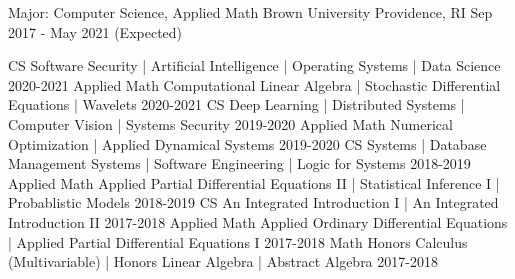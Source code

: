 \begin{cventries}
  \cventry
    {Major: Computer Science, Applied Math}
    {Brown University}
    {Providence, RI}
    {Sep 2017 - May 2021 (Expected)}
    {
        \vspace{-2em}
        \begin{cvhonors}
			\cvhonor
			{CS}
            {Software Security | Artificial Intelligence | Operating Systems | Data Science }
			{}
            {2020-2021}
			\cvhonor
			{Applied Math}
            {Computational Linear Algebra | Stochastic Differential Equations | Wavelets}
			{}
            {2020-2021}
			\cvhonor
			{CS}
            {Deep Learning | Distributed Systems | Computer Vision | Systems Security}
			{}
			{2019-2020}
			\cvhonor
			{Applied Math}
			{Numerical Optimization | Applied Dynamical Systems}
			{}
			{2019-2020}
			\cvhonor
			{CS}
			{Systems | Database Management Systems | Software Engineering | Logic for Systems}
			{}
			{2018-2019}
			\cvhonor
			{Applied Math}
            {Applied Partial Differential Equations II | Statistical Inference I | Probablistic Models}
			{}
			{2018-2019}
			\cvhonor
			{CS}
			{An Integrated Introduction I | An Integrated Introduction II}
			{}
			{2017-2018}
			\cvhonor
			{Applied Math}
			{Applied Ordinary Differential Equations | Applied Partial Differential Equations I}
			{}
			{2017-2018}
			\cvhonor
			{Math}
			{Honors Calculus (Multivariable) | Honors Linear Algebra | Abstract Algebra}
			{}
			{2017-2018}
        \end{cvhonors}
		\vspace{-1.25em}
    }
\end{cventries}

